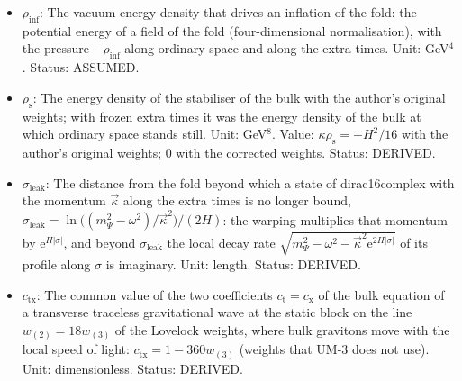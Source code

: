 \documentclass[
  10pt,
]{article}
\begin{document}
\begin{itemize}
  \(\kappa p_{\mathrm{s}} = -5H^2/16\) with the author's original
  weights; 0 with the corrected weights. Status: DERIVED.
\item
  \(\rho_{\mathrm{inf}}\): The vacuum energy density that drives an
  inflation of the fold: the potential energy of a field of the fold
  (four-dimensional normalisation), with the pressure
  \(-\rho_{\mathrm{inf}}\) along ordinary space and along the extra
  times. Unit: GeV\(^4\). Status: ASSUMED.
\item
  \(\rho_{\mathrm{s}}\): The energy density of the stabiliser of the
  bulk with the author's original weights; with frozen extra times it
  was the energy density of the bulk at which ordinary space stands
  still. Unit: GeV\(^8\). Value: \(\kappa\rho_{\mathrm{s}} = -H^2/16\)
  with the author's original weights; 0 with the corrected weights.
  Status: DERIVED.
\item
  \(\sigma_{\mathrm{leak}}\): The distance from the fold beyond which a
  state of dirac16complex with the momentum \(\vec\kappa\) along the
  extra times is no longer bound,
  \(\sigma_{\mathrm{leak}} = \ln\big((m_\Psi^2 - \omega^2)/\vec\kappa^2\big)/(2H)\):
  the warping multiplies that momentum by
  \(\mathrm{e}^{H\lvert\sigma\rvert}\), and beyond
  \(\sigma_{\mathrm{leak}}\) the local decay rate
  \(\sqrt{m_\Psi^2 - \omega^2 - \vec\kappa^2\mathrm{e}^{2H\lvert\sigma\rvert}}\)
  of its profile along \(\sigma\) is imaginary. Unit: length. Status:
  DERIVED.
\item
  \(c_{\mathrm{tx}}\): The common value of the two coefficients
  \(c_{\mathrm{t}} = c_{\mathrm{x}}\) of the bulk equation of a
  transverse traceless gravitational wave at the static block on the
  line \(w_{(2)} = 18w_{(3)}\) of the Lovelock weights, where bulk
  gravitons move with the local speed of light:
  \(c_{\mathrm{tx}} = 1 - 360w_{(3)}\) (weights that UM-3 does not use).
  Unit: dimensionless. Status: DERIVED.
\end{itemize}
\end{document}
